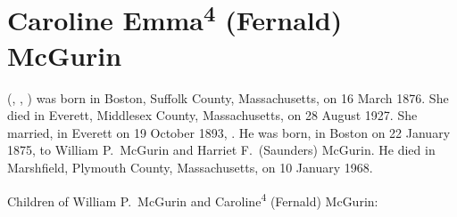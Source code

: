 \section{Caroline Emma\textsuperscript{4} (Fernald) McGurin}

 (, , ) was born in Boston, Suffolk County, Massachusetts, on 16 March 1876.\cite{Caroline4FernaldBirth} She died in Everett, Middlesex County, Massachusetts, on 28 August 1927.\cite{Caroline4FernaldDeath} She married, in Everett on 19 October 1893, . He was born, in Boston on 22 January 1875, to William P.\ McGurin and Harriet F.\ (Saunders) McGurin.\cite{JohnMcGurinBirth,WilliamMcGurinMarriage} He died in Marshfield, Plymouth County, Massachusetts, on 10 January 1968.\cite{JohnMcGurinDeath}

\begin{KidsIntro}
	Children of William P.\ McGurin and Caroline\textsuperscript{4} (Fernald) McGurin:
\end{KidsIntro}

